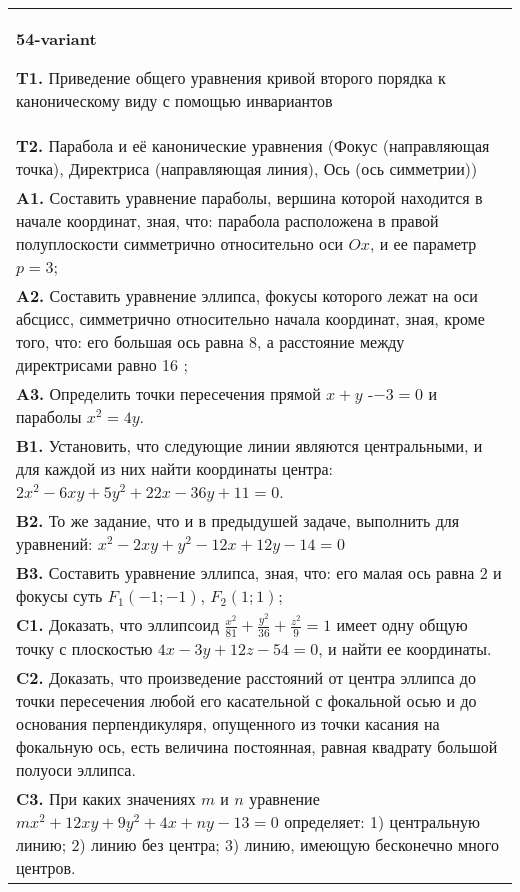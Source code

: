 \documentclass{article}
\begin{document}
\begin{tabular}{m{17cm}}
\textbf{54-variant}
\newline

\textbf{T1.} Приведение общего уравнения кривой второго порядка к каноническому виду с помощью инвариантов \\
\textbf{T2.} Парабола и её канонические уравнения (Фокус (направляющая точка), Директриса (направляющая линия), Ось (ось симметрии)) \\
\textbf{A1.} Составить уравнение параболы, вершина которой находится в начале координат, зная, что: парабола расположена в правой полуплоскости симметрично относительно оси $O x$, и ее параметр $p=3$; \\
\textbf{A2.} Составить уравнение эллипса, фокусы которого лежат на оси абсцисс, симметрично относительно начала координат, зная, кроме того, что: его большая ось равна 8, а расстояние между директрисами равно 16 ; \\
\textbf{A3.} Определить точки пересечения прямой $x+y$ -$-3=0$ и параболы $x^2=4 y$. \\
\textbf{B1.} Установить, что следующие линии являются центральными, и для каждой из них найти координаты центра: $2 x^2-6 x y+5 y^2+22 x-36 y+11=0$. \\
\textbf{B2.} То же задание, что и в предыдушей задаче, выполнить для уравнений: $x^2-2 x y+y^2-12 x+12 y-14=0$ \\
\textbf{B3.} Составить уравнение эллипса, зная, что: его малая ось равна 2 и фокусы суть $F_1(-1 ;-1)$, $F_2(1 ; 1)$; \\
\textbf{C1.} Доказать, что эллипсоид $\frac{x^2}{81}+\frac{y^2}{36}+\frac{z^2}{9}=1$ имеет одну общую точку с плоскостью $4 x-3 y+12 z-54=0$, и найти ее координаты. \\
\textbf{C2.} Доказать, что произведение расстояний от центра эллипса до точки пересечения любой его касательной с фокальной осью и до основания перпендикуляря, опущенного из точки касания на фокальную ось, есть величина постоянная, равная квадрату большой полуоси эллипса. \\
\textbf{C3.} При каких значениях $m$ и $n$ уравнение $m x^2+12 x y+9 y^2+4 x+n y-13=0$ определяет: 1) центральную линию; 2) линию без центра; 3) линию, имеющую бесконечно много центров. \\

\end{tabular}
\vspace{1cm}
\end{document}
